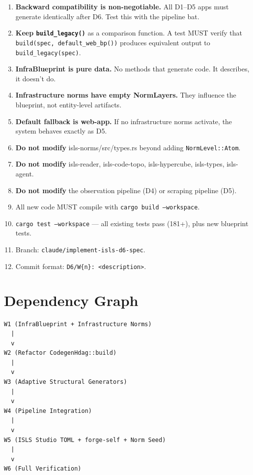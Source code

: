\documentclass[11pt,a4paper]{article}
\begin{document}
\begin{enumerate}
\item \textbf{Backward compatibility is non-negotiable.} All D1--D5 
      apps must generate identically after D6. Test this with the 
      pipeline bat.
\item \textbf{Keep \texttt{build\_legacy()}} as a comparison 
      function. A test MUST verify that 
      \texttt{build(spec, default\_web\_bp())} produces equivalent 
      output to \texttt{build\_legacy(spec)}.
\item \textbf{InfraBlueprint is pure data.} No methods that generate 
      code. It describes, it doesn't do.
\item \textbf{Infrastructure norms have empty NormLayers.} They 
      influence the blueprint, not entity-level artifacts.
\item \textbf{Default fallback is web-app.} If no infrastructure 
      norms activate, the system behaves exactly as D5.
\item \textbf{Do not modify} isls-norms/src/types.rs beyond adding 
      \texttt{NormLevel::Atom}.
\item \textbf{Do not modify} isls-reader, isls-code-topo, 
      isls-hypercube, isls-types, isls-agent.
\item \textbf{Do not modify} the observation pipeline (D4) or scraping 
      pipeline (D5).
\item All new code MUST compile with \texttt{cargo build --workspace}.
\item \texttt{cargo test --workspace} --- all existing tests pass 
      (181+), plus new blueprint tests.
\item Branch: \texttt{claude/implement-isls-d6-spec}.
\item Commit format: \texttt{D6/W\{n\}: <description>}.
\end{enumerate}


\section{Dependency Graph}

\begin{verbatim}
W1 (InfraBlueprint + Infrastructure Norms)
  |
  v
W2 (Refactor CodegenHdag::build)
  |
  v
W3 (Adaptive Structural Generators)
  |
  v
W4 (Pipeline Integration)
  |
  v
W5 (ISLS Studio TOML + forge-self + Norm Seed)
  |
  v
W6 (Full Verification)
\end{verbatim}
\end{document}
